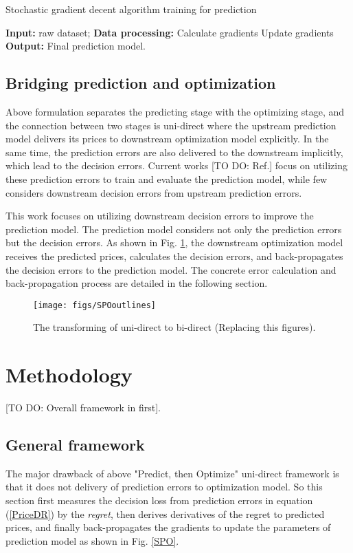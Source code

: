 \documentclass[journal]{IEEEtran}
\begin{document}
\begin{algorithm}[h]
  \label{SGDPred}
  \caption{Stochastic gradient decent algorithm training for prediction}
  {\small{
    \begin{algorithmic}[1]
      \STATE \textbf{Input:} raw dataset;
      \STATE \textbf{Data processing:}
      \STATE Calculate gradients
      \STATE Update gradients
      \ENDFOR
      \STATE \textbf{Output:} Final prediction model.
    \end{algorithmic}
  }}
\end{algorithm}


\subsection{Bridging prediction and optimization}
Above formulation separates the predicting stage with the optimizing stage, and the connection between two stages is uni-direct where the upstream prediction model delivers its prices to downstream optimization model explicitly. In the same time, the prediction errors are also delivered to the downstream implicitly, which lead to the decision errors. Current works [TO DO: Ref.] focus on utilizing these prediction errors to train and evaluate the prediction model, while few considers downstream decision errors from upstream prediction errors. 

This work focuses on utilizing downstream decision errors to improve the prediction model. The prediction model considers not only the prediction errors but the decision errors. As shown in Fig. \ref{transforming}, the downstream optimization model receives the predicted prices, calculates the decision errors, and back-propagates the decision errors to the prediction model. The concrete error calculation and back-propagation process are detailed in the following section.

\begin{figure}[ht]
  \centering
  \texttt{[image: figs/SPOoutlines]}
  \caption{The transforming of uni-direct to bi-direct (Replacing this figures).}
  \label{transforming}
\end{figure}

\section{Methodology}
[TO DO: Overall framework in first].

\subsection{General framework}
The major drawback of above "Predict, then Optimize" uni-direct framework is that it does not delivery of prediction errors to optimization model. So this section first measures the decision loss from prediction errors in equation (\ref{PriceDR}) by the \textit{regret}, then derives derivatives of the regret to predicted prices, and finally back-propagates the gradients to update the parameters of prediction model as shown in Fig. \ref{SPO}.
\end{document}
